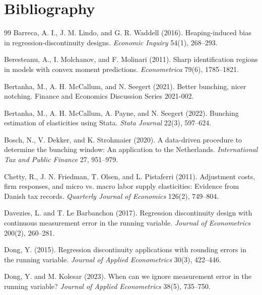 \documentclass[11pt]{article}
\theoremstyle{definition}
\theoremstyle{plain}
\theoremstyle{remark}
\begin{document}
\section*{Bibliography}
\begin{thebibliography}{99}
Barreca, A. I., J. M. Lindo, and G. R. Waddell (2016).
Heaping-induced bias in regression-discontinuity designs.
\emph{Economic Inquiry} 54(1), 268--293.

Beresteanu, A., I. Molchanov, and F. Molinari (2011).
Sharp identification regions in models with convex moment predictions.
\emph{Econometrica} 79(6), 1785--1821.

Bertanha, M., A. H. McCallum, and N. Seegert (2021).
Better bunching, nicer notching.
Finance and Economics Discussion Series 2021-002.

Bertanha, M., A. H. McCallum, A. Payne, and N. Seegert (2022).
Bunching estimation of elasticities using Stata.
\emph{Stata Journal} 22(3), 597--624.

Bosch, N., V. Dekker, and K. Strohmaier (2020).
A data-driven procedure to determine the bunching window: An application to the Netherlands.
\emph{International Tax and Public Finance} 27, 951--979.

Chetty, R., J. N. Friedman, T. Olsen, and L. Pistaferri (2011).
Adjustment costs, firm responses, and micro vs. macro labor supply elasticities: Evidence from Danish tax records.
\emph{Quarterly Journal of Economics} 126(2), 749--804.

Davezies, L. and T. Le Barbanchon (2017).
Regression discontinuity design with continuous measurement error in the running variable.
\emph{Journal of Econometrics} 200(2), 260--281.

Dong, Y. (2015).
Regression discontinuity applications with rounding errors in the running variable.
\emph{Journal of Applied Econometrics} 30(3), 422--446.

Dong, Y. and M. Kolesar (2023).
When can we ignore measurement error in the running variable?
\emph{Journal of Applied Econometrics} 38(5), 735--750.


\end{thebibliography}
\end{document}
